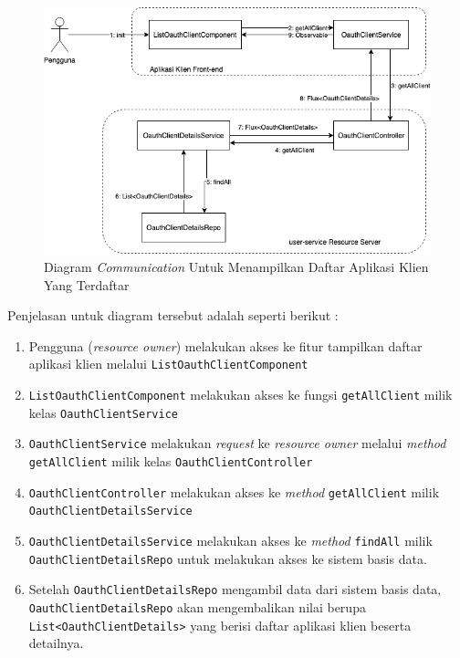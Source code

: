 \documentclass[pdftex,12pt, oneside]{article}
\begin{document}
\begin{itemize}
	\begin{figure}[H]
		\centering
		\includegraphics[width=1\textwidth]{./resources/comm-dia-list-client}
		\caption{Diagram \textit{Communication} Untuk Menampilkan Daftar Aplikasi Klien Yang Terdaftar}
		\label{fig:comm-dia-list-client}
	\end{figure}
	
	Penjelasan untuk diagram tersebut adalah seperti berikut :
	
	\begin{enumerate}
		\item Pengguna (\textit{resource owner}) melakukan akses ke fitur tampilkan daftar aplikasi klien melalui \texttt{ListOauthClientComponent}
		
		\item \texttt{ListOauthClientComponent} melakukan akses ke fungsi \texttt{getAllClient} milik kelas \texttt{OauthClientService}
		
		\item \texttt{OauthClientService} melakukan \textit{request} ke \textit{resource owner} melalui \textit{method} \texttt{getAllClient} milik kelas \texttt{OauthClientController}
		
		\item \texttt{OauthClientController} melakukan akses ke \textit{method} \texttt{getAllClient} milik \texttt{OauthClientDetailsService}
		
		\item \texttt{OauthClientDetailsService} melakukan akses ke \textit{method} \texttt{findAll} milik \texttt{OauthClientDetailsRepo} untuk melakukan akses ke sistem basis data.
		
		\item Setelah \texttt{OauthClientDetailsRepo} mengambil data dari sistem basis data, \texttt{OauthClientDetailsRepo} akan mengembalikan nilai berupa \texttt{List<OauthClientDetails>} yang berisi daftar aplikasi klien beserta detailnya.
		

\end{enumerate}
\end{itemize}
\end{document}
